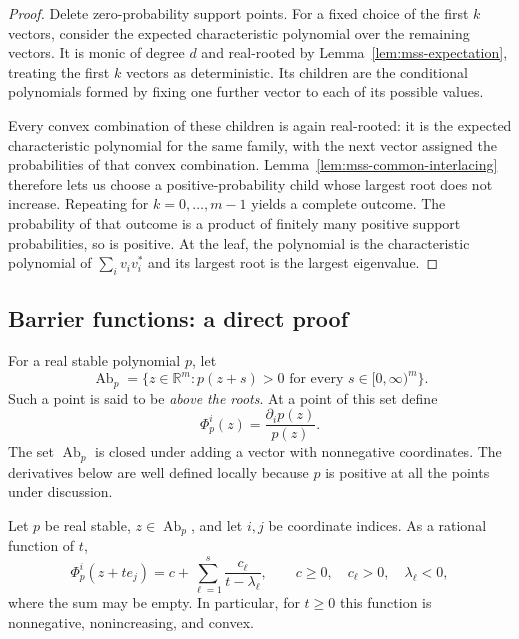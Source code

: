 \begin{proof}
Delete zero-probability support points.  For a fixed choice of the
first $k$ vectors, consider the expected characteristic polynomial
over the remaining vectors.  It is monic of degree $d$ and
real-rooted by Lemma~\ref{lem:mss-expectation}, treating the first
$k$ vectors as deterministic.  Its children are the conditional
polynomials formed by fixing one further vector to each of its
possible values.

Every convex combination of these children is again real-rooted:
it is the expected characteristic polynomial for the same family,
with the next vector assigned the probabilities of that convex
combination.  Lemma~\ref{lem:mss-common-interlacing} therefore lets
us choose a positive-probability child whose largest root does not
increase.  Repeating for $k=0,\ldots,m-1$ yields a complete outcome.
The probability of that outcome is a product of finitely many
positive support probabilities, so is positive.  At the leaf, the
polynomial is the characteristic polynomial of
$\sum_i v_iv_i^*$ and its largest root is the largest eigenvalue.
\end{proof}

\subsection{Barrier functions: a direct proof}

For a real stable polynomial $p$, let
\[
 \operatorname{Ab}_p
 =\{z\in\mathbb R^m:p(z+s)>0
                    \text{ for every }s\in[0,\infty)^m\}.
\]
Such a point is said to be \emph{above the roots}.  At a point of
this set define
\[
 \Phi_p^i(z)=\frac{\partial_i p(z)}{p(z)}.
\]
The set $\operatorname{Ab}_p$ is closed under adding a vector with
nonnegative coordinates.  The derivatives below are well defined
locally because $p$ is positive at all the points under discussion.

\begin{lemma}
\label{lem:mss-partial-fractions}
Let $p$ be real stable, $z\in\operatorname{Ab}_p$, and let $i,j$ be
coordinate indices.  As a rational function of $t$,
\begin{equation}
 \Phi_p^i(z+te_j)
 =c+\sum_{\ell=1}^s\frac{c_\ell}{t-\lambda_\ell},
 \qquad c\geq0,\quad c_\ell>0,\quad\lambda_\ell<0,
 \label{eq:mss-positive-partial-fractions}
\end{equation}
where the sum may be empty.  In particular, for $t\geq0$ this
function is nonnegative, nonincreasing, and convex.
\end{lemma}

